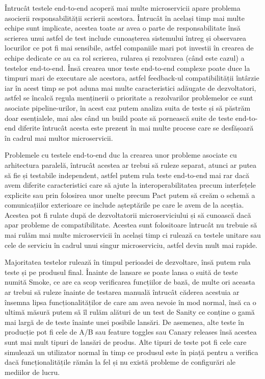 Întrucât testele end-to-end acoperă mai multe microservicii apare problema asocierii 
responsabilității scrierii acestora. Întrucât în același timp mai multe echipe sunt implicate,
acestea toate ar avea o parte de responsabilitate însă scrierea unui astfel de test 
include cunoașterea sistemului întreg și observarea locurilor ce pot fi mai sensibile,
astfel companiile mari pot investii în crearea de echipe dedicate ce au ca rol scrierea, 
rularea și rezolvarea (când este cazul) a testelor end-to-end. Însă crearea unor teste
end-to-end complexe poate duce la timpuri mari de executare ale acestora, astfel 
feedback-ul compatibilității întârzie iar în acest timp se pot aduna mai multe caracteristici
adăugate de dezvoltatori, astfel se încalcă regula menținerii o prioritate a rezolvarilor
problemelor ce sunt asociate pipeline-urilor, în acest caz putem analiza suita de teste și să
păstrăm doar esențialele, mai ales când un build poate să pornească suite de teste end-to-end diferite
întrucât acesta este prezent în mai multe procese care se desfășoară în cadrul mai multor
microservicii.

Problemele cu testele end-to-end duc la crearea unor probleme asociate cu arhitectura paralelă,
întrucât acestea ar trebui să ruleze separat, atunci ar putea să fie și testabile independent,
astfel putem rula teste end-to-end mai rar dacă avem diferite caracteristici care să 
ajute la interoperabilitatea precum interfețele explicite sau prin folosirea unor unelte precum Pact 
putem să creăm o schemă a comunicațiilor exterioare ce include așteptările pe care le avem de la 
aceștia. Acestea pot fi rulate după de dezvoltatorii microserviciului și să cunoască 
dacă apar probleme de compatibilitate. Acestea sunt folositoare întrucât nu trebuie să mai rulăm
mai multe microservicii în același timp ci rulează ca testele unitare sau cele de serviciu în cadrul
unui singur microserviciu, astfel devin mult mai rapide.

Majoritatea testelor rulează în timpul perioadei de dezvoltare, însă putem rula teste 
și pe produsul final. Înainte de lansare se poate lansa o suită de teste numită Smoke, ce 
are ca scop verificarea funcțiilor de bază, de multe ori aceasta ar trebui să ruleze înainte de testarea
manuală întrucât căderea acestuia ar însemna lipsa funcționalităților de care am avea nevoie 
în mod normal, însă ca o ultimă măsură putem să îl rulăm alături de un test de Sanity ce conține
o gamă mai largă de de teste înainte unei posibile lansări. De asemenea, alte
teste în producție pot fi cele de A/B sau feature toggles sau Canary releases însă acestea
sunt mai mult tipuri de lansări de produs. Alte tipuri de teste pot fi cele care simulează
un utilizator normal în timp ce produsul este în piață pentru a verifica dacă funcționalitățile rămân 
la fel și nu există probleme de configurări ale mediilor de lucru.

